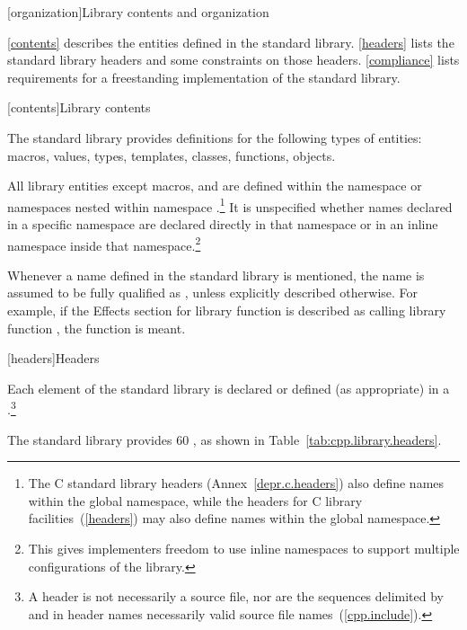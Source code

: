 [organization]{Library contents and organization}

\pnum
\ref{contents} describes the entities defined in the \Cpp standard library.
\ref{headers} lists the standard library headers and some constraints on those headers.
\ref{compliance} lists requirements for a freestanding implementation of the \Cpp
standard library.

[contents]{Library contents}

\pnum
The \Cpp standard library provides definitions for the following types of entities:
macros, values, types, templates, classes, functions, objects.

\pnum
All library entities except macros,
and
are defined within the namespace
or namespaces nested within namespace
.\footnote{The C standard library headers (Annex~\ref{depr.c.headers}) also define
names within the global namespace, while the \Cpp headers for C library
facilities~(\ref{headers}) may also define names within the global namespace.}%
It is unspecified whether names declared in a specific namespace are declared
directly in that namespace or in an inline namespace inside that
namespace.\footnote{This gives implementers freedom to use inline namespaces to
support multiple configurations of the library.}

\pnum
Whenever a name  defined in the standard library is mentioned,
the name  is assumed to be fully qualified as
,
unless explicitly described otherwise. For example, if the Effects section
for library function  is described as calling library function ,
the function
is meant.

[headers]{Headers}

\pnum
Each element of the \Cpp standard library is declared or defined (as appropriate) in a
.\footnote{ A header is not necessarily a source file, nor are the
sequences delimited by \tcode{<} and \tcode{>} in header names necessarily valid source
file names~(\ref{cpp.include}). }

\pnum
The \Cpp standard library provides
60
,
%
as shown in Table~\ref{tab:cpp.library.headers}.


